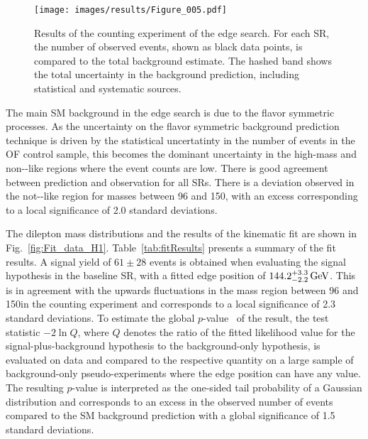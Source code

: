 \begin{figure}[htbp!]
\begin{center}
\texttt{[image: images/results/Figure\_005.pdf]}
\caption{Results of the counting experiment of the edge search. For each SR, the number of observed events, shown as black data points, is compared to the total background estimate.  The hashed band shows the total uncertainty in the background prediction, including statistical and systematic sources.}
\label{fig:edgeResults}
\end{center}
\end{figure}                                                                                                                                                               

The main SM background in the edge search is due to the flavor symmetric processes. 
As the uncertainty on the flavor symmetric background prediction technique is driven by the statistical uncertatinty in the number of events in the OF control sample, this becomes the dominant uncertainty in the high-mass and non-\ttbar-like regions where the event counts are low. 
There is good agreement between prediction and observation for all SRs. 
There is a deviation observed in the not-\ttbar-like region for masses between 96 and 150\GeV, with an excess corresponding to a local significance of 2.0 standard deviations.

The dilepton mass distributions and the results of the kinematic fit are shown in Fig.~\ref{fig:Fit_data_H1}.
Table~\ref{tab:fitResults} presents a summary of the fit results.
A signal yield of $61 \pm 28$ events is obtained when evaluating the signal hypothesis in the baseline SR,
with a fitted edge position of $144.2^{+3.3}_{-2.2}\,\text{Ge\hspace{-.08em}V}$. This is in agreement with the upwards fluctuations in the mass
region between 96 and 150\GeV in the counting experiment and corresponds to a local significance of 2.3 standard deviations.
To estimate the global $p$-value~\cite{Gross:2010qma} of the result, the test statistic $-2\ln Q$,
where $Q$ denotes the ratio of the fitted likelihood value for the signal-plus-background
hypothesis to the background-only hypothesis, is evaluated on data and compared to the respective quantity on a large sample
of background-only pseudo-experiments where the edge position can have any value. The resulting $p$-value is interpreted as the one-sided tail probability
of a Gaussian distribution and corresponds to an excess in the observed number of events compared to the SM background prediction
with a global significance of 1.5 standard deviations.

